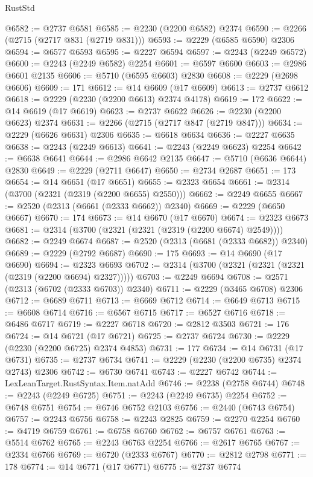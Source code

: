 \begin{lexlean}{RustStd}
\begin{coremodule}
@6582 := @2737 @6581
@6585 := @2230 (@2200 @6582) @2374
@6590 := @2266 (@2715 (@2717 @831 (@2719 @831)))
@6593 := @2229 (@6585 @6590) @2306
@6594 := @6577 @6593
@6595 := @2227 @6594
@6597 := @2243 (@2249 @6572)
@6600 := @2243 (@2249 @6582) @2254
@6601 := @6597 @6600
@6603 := @2986 @6601 @2135
@6606 := @5710 (@6595 @6603) @2830
@6608 := @2229 (@2698 @6606)
@6609 := 171
@6612 := @14 @6609 (@17 @6609)
@6613 := @2737 @6612
@6618 := @2229 (@2230 (@2200 @6613) @2374 @4178)
@6619 := 172
@6622 := @14 @6619 (@17 @6619)
@6623 := @2737 @6622
@6626 := @2230 (@2200 @6623) @2374
@6631 := @2266 (@2715 (@2717 @847 (@2719 @847)))
@6634 := @2229 (@6626 @6631) @2306
@6635 := @6618 @6634
@6636 := @2227 @6635
@6638 := @2243 (@2249 @6613)
@6641 := @2243 (@2249 @6623) @2254
@6642 := @6638 @6641
@6644 := @2986 @6642 @2135
@6647 := @5710 (@6636 @6644) @2830
@6649 := @2229 (@2711 @6647)
@6650 := @2734 @2687
@6651 := 173
@6654 := @14 @6651 (@17 @6651)
@6655 := @2323 @6654
@6661 := @2314 (@3700 (@2321 (@2319 (@2200 @6655) @2550)))
@6662 := @2249 @6655
@6667 := @2520 (@2313 (@6661 (@2333 @6662)) @2340)
@6669 := @2229 (@6650 @6667)
@6670 := 174
@6673 := @14 @6670 (@17 @6670)
@6674 := @2323 @6673
@6681 := @2314 (@3700 (@2321 (@2321 (@2319 (@2200 @6674) @2549))))
@6682 := @2249 @6674
@6687 := @2520 (@2313 (@6681 (@2333 @6682)) @2340)
@6689 := @2229 (@2792 @6687)
@6690 := 175
@6693 := @14 @6690 (@17 @6690)
@6694 := @2323 @6693
@6702 := @2314 (@3700 (@2321 (@2321 (@2321 (@2319 (@2200 @6694) @2327)))))
@6703 := @2249 @6694
@6708 := @2571 (@2313 (@6702 (@2333 @6703)) @2340)
@6711 := @2229 (@3465 @6708) @2306
@6712 := @6689 @6711
@6713 := @6669 @6712
@6714 := @6649 @6713
@6715 := @6608 @6714
@6716 := @6567 @6715
@6717 := @6527 @6716
@6718 := @6486 @6717
@6719 := @2227 @6718
@6720 := @2812 @3503
@6721 := 176
@6724 := @14 @6721 (@17 @6721)
@6725 := @2737 @6724
@6730 := @2229 (@2230 (@2200 @6725) @2374 @4853)
@6731 := 177
@6734 := @14 @6731 (@17 @6731)
@6735 := @2737 @6734
@6741 := @2229 (@2230 (@2200 @6735) @2374 @2743) @2306
@6742 := @6730 @6741
@6743 := @2227 @6742
@6744 := LexLeanTarget.RustSyntax.Item.natAdd
@6746 := @2238 (@2758 @6744)
@6748 := @2243 (@2249 @6725)
@6751 := @2243 (@2249 @6735) @2254
@6752 := @6748 @6751
@6754 := @6746 @6752 @2103
@6756 := @2440 (@6743 @6754)
@6757 := @2243 @6756
@6758 := @2243 @2825
@6759 := @2270 @2254
@6760 := @4719 @6759
@6761 := @6758 @6760
@6762 := @6757 @6761
@6763 := @5514 @6762
@6765 := @2243 @6763 @2254
@6766 := @2617 @6765
@6767 := @2334 @6766
@6769 := @6720 (@2333 @6767)
@6770 := @2812 @2798
@6771 := 178
@6774 := @14 @6771 (@17 @6771)
@6775 := @2737 @6774

\end{coremodule}
\end{lexlean}

